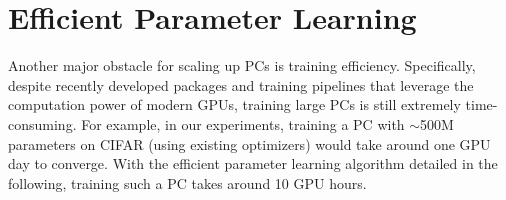 \documentclass{article} %
\newcommand{\guy}[1]{\textcolor{blue}{\textbf{[Guy: #1]}}}
\begin{document}




\section{Efficient Parameter Learning}
\label{sec:efficient-pc-learning}
Another major obstacle for scaling up PCs is training efficiency. Specifically, despite recently developed packages \citep{dang2021juice,molina2019spflow} and training pipelines \citep{peharz2020einsum} that leverage the computation power of modern GPUs, training large PCs is still extremely time-consuming. For example, in our experiments, training a PC with $\sim$500M parameters on CIFAR (using existing optimizers) would take around one GPU day to converge. With the efficient parameter learning algorithm detailed in the following, training such a PC takes around 10 GPU hours.
\end{document}

